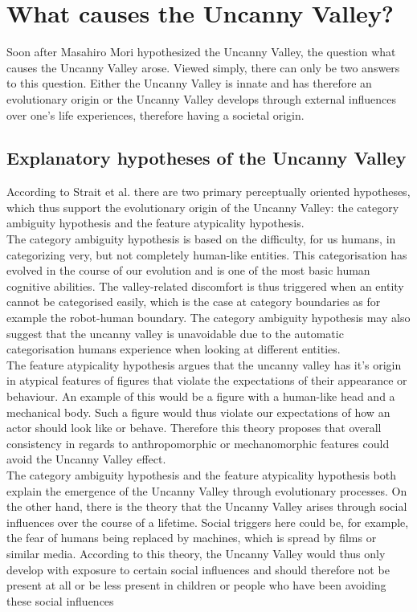\chapter{What causes the Uncanny Valley?}
Soon after Masahiro Mori hypothesized the Uncanny Valley, the question what causes the Uncanny Valley arose. Viewed simply, there can only be two answers to this question. Either the Uncanny Valley is innate and has therefore an evolutionary origin or the Uncanny Valley develops through external influences over one's life experiences, therefore having a societal origin. 
\section{Explanatory hypotheses of the Uncanny Valley}
According to Strait et al. \cite{childrens_responding} there are two primary perceptually oriented hypotheses, which thus support the evolutionary origin of the Uncanny Valley: the category ambiguity hypothesis and the feature atypicality hypothesis.\\
The category ambiguity hypothesis is based on the difficulty, for us humans, in categorizing very, but not completely human-like entities. This categorisation has evolved in the course of our evolution and is one of the
most basic human cognitive abilities. The valley-related discomfort is thus triggered when an entity cannot be categorised easily, which is the case at category boundaries as for example the robot-human boundary. The category ambiguity hypothesis may also suggest that the uncanny valley is unavoidable due to the automatic categorisation humans experience when looking at different entities. \cite{childrens_responding}\\
The feature atypicality hypothesis argues that the uncanny valley has it's origin in atypical features of figures that violate the expectations of their appearance or behaviour. An example of this would be a figure with a human-like head and a mechanical body. Such a figure would thus violate our expectations of how an actor should look like or behave. Therefore this theory proposes that overall consistency in regards to anthropomorphic or mechanomorphic features could avoid the Uncanny Valley effect. \cite{childrens_responding}\\
The category ambiguity hypothesis and the feature atypicality hypothesis both explain the emergence of the Uncanny Valley through evolutionary processes. On the other hand, there is the theory that the Uncanny Valley arises through social influences over the course of a lifetime. Social triggers here could be, for example, the fear of humans being replaced by machines, which is spread by films or similar media. According to this theory, the Uncanny Valley would thus only develop with exposure to certain social influences and should therefore not be present at all or be less present in children or people who have been avoiding these social influences \cite{childrens_responding}
